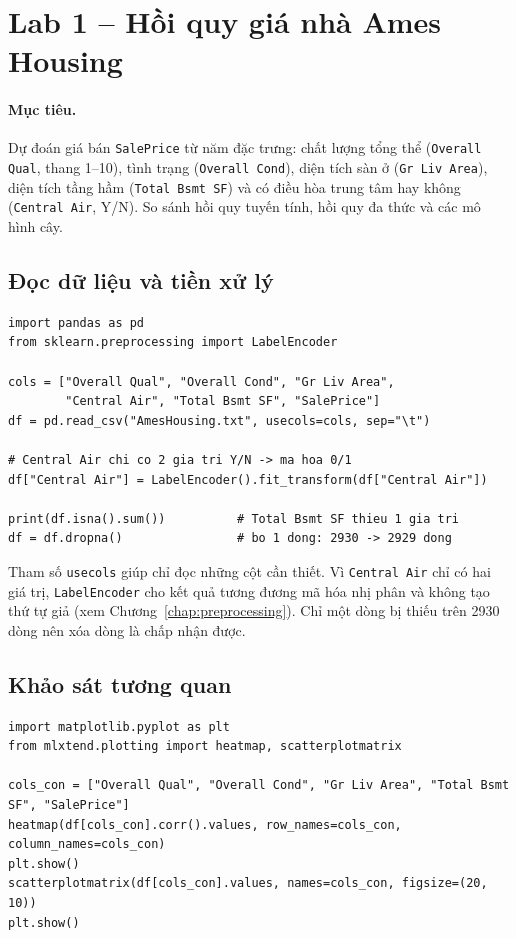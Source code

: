 \section{Lab 1 -- Hồi quy giá nhà Ames Housing}
\label{sec:lab-ames}

\paragraph{Mục tiêu.} Dự đoán giá bán \texttt{SalePrice} từ năm đặc trưng: chất lượng tổng thể (\texttt{Overall Qual}, thang 1--10), tình trạng (\texttt{Overall Cond}), diện tích sàn ở (\texttt{Gr Liv Area}), diện tích tầng hầm (\texttt{Total Bsmt SF}) và có điều hòa trung tâm hay không (\texttt{Central Air}, Y/N). So sánh hồi quy tuyến tính, hồi quy đa thức và các mô hình cây.

\subsection{Đọc dữ liệu và tiền xử lý}

\begin{lstlisting}[caption={Lab 1 -- đọc và tiền xử lý dữ liệu}]
import pandas as pd
from sklearn.preprocessing import LabelEncoder

cols = ["Overall Qual", "Overall Cond", "Gr Liv Area",
        "Central Air", "Total Bsmt SF", "SalePrice"]
df = pd.read_csv("AmesHousing.txt", usecols=cols, sep="\t")

# Central Air chi co 2 gia tri Y/N -> ma hoa 0/1
df["Central Air"] = LabelEncoder().fit_transform(df["Central Air"])

print(df.isna().sum())          # Total Bsmt SF thieu 1 gia tri
df = df.dropna()                # bo 1 dong: 2930 -> 2929 dong
\end{lstlisting}

Tham số \texttt{usecols} giúp chỉ đọc những cột cần thiết. Vì \texttt{Central Air} chỉ có hai giá trị, \texttt{LabelEncoder} cho kết quả tương đương mã hóa nhị phân và không tạo thứ tự giả (xem Chương~\ref{chap:preprocessing}). Chỉ một dòng bị thiếu trên 2930 dòng nên xóa dòng là chấp nhận được.

\subsection{Khảo sát tương quan}

\begin{lstlisting}[caption={Lab 1 -- ma trận tương quan và ma trận biểu đồ phân tán}]
import matplotlib.pyplot as plt
from mlxtend.plotting import heatmap, scatterplotmatrix

cols_con = ["Overall Qual", "Overall Cond", "Gr Liv Area", "Total Bsmt SF", "SalePrice"]
heatmap(df[cols_con].corr().values, row_names=cols_con, column_names=cols_con)
plt.show()
scatterplotmatrix(df[cols_con].values, names=cols_con, figsize=(20, 10))
plt.show()
\end{lstlisting}

